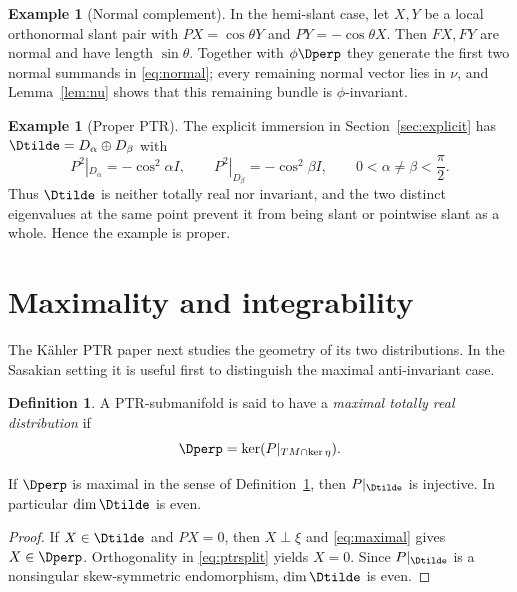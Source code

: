 \documentclass[11pt]{article}
\theoremstyle{definition}\newtheorem{definition}[theorem]{Definition}\newtheorem{example}[theorem]{Example}
\theoremstyle{remark}\newtheorem{remark}[theorem]{Remark}
\begin{document}
\begin{example}[Normal complement]\label{ex:normal}
In the hemi-slant case, let $X,Y$ be a local orthonormal slant pair with $PX=\cos\theta Y$ and $PY=-\cos\theta X$. Then $FX,FY$ are normal and have length $\sin\theta$. Together with $\phi\Dperp$ they generate the first two normal summands in \eqref{eq:normal}; every remaining normal vector lies in $\nu$, and Lemma~\ref{lem:nu} shows that this remaining bundle is $\phi$-invariant.
\end{example}

\begin{example}[Proper PTR]\label{ex:proper}
The explicit immersion in Section~\ref{sec:explicit} has
$\Dtilde=D_\alpha\oplus D_\beta$ with
\[
 P^2|_{D_\alpha}=-\cos^2\alpha I,\qquad
 P^2|_{D_\beta}=-\cos^2\beta I,
 \qquad 0<\alpha\ne\beta<\frac\pi2.
\]
Thus $\Dtilde$ is neither totally real nor invariant, and the two distinct eigenvalues at the same point prevent it from being slant or pointwise slant as a whole. Hence the example is proper.
\end{example}





\section{Maximality and integrability}
The K\"ahler PTR paper next studies the geometry of its two distributions. In the Sasakian setting it is useful first to distinguish the maximal anti-invariant case.
\begin{definition}\label{def:maximal}
A PTR-submanifold is said to have a \emph{maximal totally real distribution} if
\begin{equation}\label{eq:maximal}
 \Dperp=\ker(P|_{TM\cap\ker\eta}).
\end{equation}
\end{definition}

\begin{proposition}\label{prop:injective}
If \(\Dperp\) is maximal in the sense of Definition~\ref{def:maximal}, then \(P|_{\Dtilde}\) is injective. In particular $\dim\Dtilde$ is even.
\end{proposition}
\begin{proof}
If $X\in\Dtilde$ and $PX=0$, then $X\perp\xi$ and \eqref{eq:maximal} gives $X\in\Dperp$. Orthogonality in \eqref{eq:ptrsplit} yields $X=0$. Since $P|_{\Dtilde}$ is a nonsingular skew-symmetric endomorphism, $\dim\Dtilde$ is even.
\end{proof}
\end{document}
